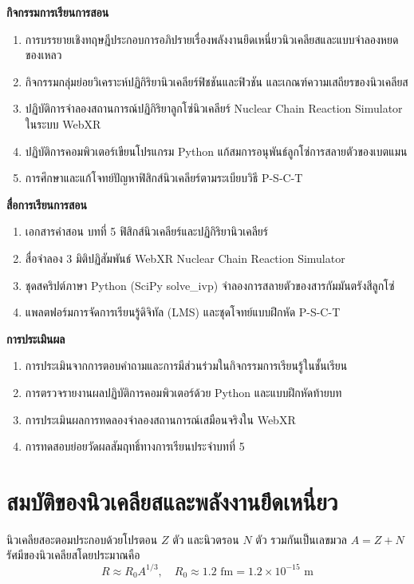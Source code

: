 \begin{lessonplanbox}
\noindent\textbf{กิจกรรมการเรียนการสอน}
\begin{enumerate}
    \item การบรรยายเชิงทฤษฎีประกอบการอภิปรายเรื่องพลังงานยึดเหนี่ยวนิวเคลียสและแบบจำลองหยดของเหลว
    \item กิจกรรมกลุ่มย่อยวิเคราะห์ปฏิกิริยานิวเคลียร์ฟิชชันและฟิวชัน และเกณฑ์ความเสถียรของนิวเคลียส
    \item ปฏิบัติการจำลองสถานการณ์ปฏิกิริยาลูกโซ่นิวเคลียร์ Nuclear Chain Reaction Simulator ในระบบ WebXR
    \item ปฏิบัติการคอมพิวเตอร์เขียนโปรแกรม Python แก้สมการอนุพันธ์ลูกโซ่การสลายตัวของเบตแมน
    \item การศึกษาและแก้โจทย์ปัญหาฟิสิกส์นิวเคลียร์ตามระเบียบวิธี P-S-C-T
\end{enumerate}

\noindent\textbf{สื่อการเรียนการสอน}
\begin{enumerate}
    \item เอกสารคำสอน บทที่ 5 ฟิสิกส์นิวเคลียร์และปฏิกิริยานิวเคลียร์
    \item สื่อจำลอง 3 มิติปฏิสัมพันธ์ WebXR Nuclear Chain Reaction Simulator
    \item ชุดสคริปต์ภาษา Python (SciPy solve\_ivp) จำลองการสลายตัวของสารกัมมันตรังสีลูกโซ่
    \item แพลตฟอร์มการจัดการเรียนรู้ดิจิทัล (LMS) และชุดโจทย์แบบฝึกหัด P-S-C-T
\end{enumerate}

\noindent\textbf{การประเมินผล}
\begin{enumerate}
    \item การประเมินจากการตอบคำถามและการมีส่วนร่วมในกิจกรรมการเรียนรู้ในชั้นเรียน
    \item การตรวจรายงานผลปฏิบัติการคอมพิวเตอร์ด้วย Python และแบบฝึกหัดท้ายบท
    \item การประเมินผลการทดลองจำลองสถานการณ์เสมือนจริงใน WebXR
    \item การทดสอบย่อยวัดผลสัมฤทธิ์ทางการเรียนประจำบทที่ 5
\end{enumerate}
\end{lessonplanbox}
\newpage

\section{สมบัติของนิวเคลียสและพลังงานยึดเหนี่ยว}

นิวเคลียสอะตอมประกอบด้วยโปรตอน $Z$ ตัว และนิวตรอน $N$ ตัว รวมกันเป็นเลขมวล $A = Z + N$ รัศมีของนิวเคลียสโดยประมาณคือ
\begin{equation}
R \approx R_0 A^{1/3}, \quad R_0 \approx 1.2\text{ fm} = 1.2 \times 10^{-15}\text{ m}
\end{equation}

